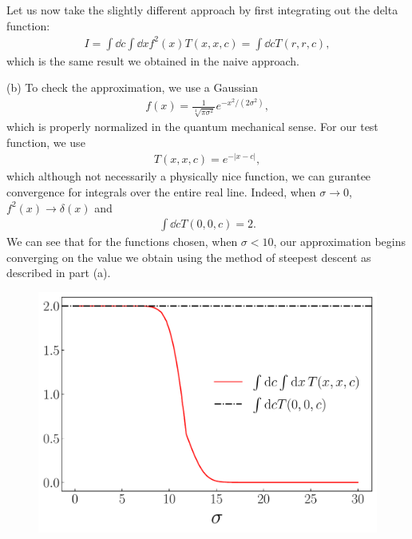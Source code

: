 {Let us now take the slightly different approach by first integrating out the delta function:
\begin{align}
    I = \int \dd{c} \int \dd{x} f^2(x) T(x,x,c) = \int \dd{c} T(r,r,c)
,\end{align}
which is the same result we obtained in the naive approach.


(b) To check the approximation, we use a Gaussian
\begin{align}
    f(x) = \frac{1}{\sqrt[4]{\pi \sigma^2}} e^{-x^2/(2 \sigma^2)}
,\end{align}
which is properly normalized in the quantum mechanical sense.
For our test function, we use
\begin{align}
    T(x,x,c) = e^{-|x - c|}
,\end{align}
which although not necessarily a physically nice function, we can gurantee convergence for integrals over the entire real line.
Indeed, when $\sigma \rightarrow 0$, $f^2(x) \rightarrow \delta(x)$ and
\begin{align}
    \int \dd{c} T(0,0,c) = 2
.\end{align}
We can see that for the functions chosen, when $\sigma < 10$, our approximation begins converging on the value we obtain using the method of steepest descent as described in part (a).

\begin{figure}[h!tb]
    \centering
    \includegraphics[width=0.7\linewidth]{prob1.pdf}
\end{figure}

}



